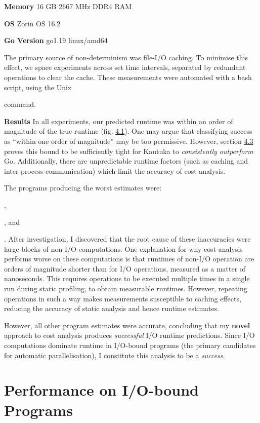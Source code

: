 \textbf{Memory} 16 GB 2667 MHz DDR4 RAM

\textbf{OS} Zorin OS 16.2

\textbf{Go Version} go1.19 linux/amd64

The primary source of non-determinism was file-I/O caching. To minimise this effect, we space experiments across set time intervals, separated by redundant operations to clear the cache. These measurements were automated with a bash script, using the Unix  command.

\textbf{Results} In all experiments, our predicted runtime was within an order of magnitude of the true runtime (fig. \hyperref[fig:4.1]{4.1}). One may argue that classifying success as ``within one order of magnitude'' may be too permissive. However, section \hyperref[sec:4.3]{4.3} proves this bound to be sufficiently tight for Kautuka to \textit{consistently outperform} Go. Additionally, there are unpredictable runtime factors (such as caching and inter-process communication) which limit the accuracy of cost analysis.

The programs producing the worst estimates were: , , and . After investigation, I discovered that the root cause of these inaccuracies were large blocks of non-I/O computations. One explanation for why cost analysis performs worse on these computations is that runtimes of non-I/O operation are orders of magnitude shorter than for I/O operations, measured as a matter of nanoseconds. This requires operations to be executed multiple times in a single run during static profiling, to obtain measurable runtimes. However, repeating operations in such a way makes measurements susceptible to caching effects, reducing the accuracy of static analysis and hence runtime estimates.

However, all other program estimates were accurate, concluding that my \textbf{novel} approach to cost analysis produces \textit{successful} I/O runtime predictions. Since I/O computations dominate runtime in I/O-bound programs (the primary candidates for automatic parallelisation), I constitute this analysis to be a \textit{success}.


\section{Performance on I/O-bound Programs}

\label{sec:4.3}

